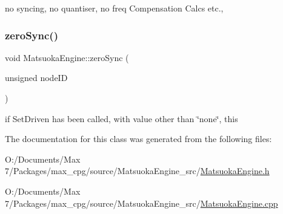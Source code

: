no syncing, no quantiser, no freq Compensation Calcs etc., 

\mbox{\label{classMatsuokaEngine_a9ecbc93a17a602d8358c189363397575}} 
\subsubsection{\texorpdfstring{zero\+Sync()}{zeroSync()}}
{\footnotesize\ttfamily void Matsuoka\+Engine\+::zero\+Sync (\begin{DoxyParamCaption}\item[{unsigned}]{node\+ID }\end{DoxyParamCaption})}



if Set\+Driven has been called, with value other than \char`\"{}none\char`\"{}, this 



The documentation for this class was generated from the following files\+:\begin{DoxyCompactItemize}
\item 
O\+:/\+Documents/\+Max 7/\+Packages/max\+\_\+cpg/source/\+Matsuoka\+Engine\+\_\+src/\mbox{\hyperlink{MatsuokaEngine_8h}{Matsuoka\+Engine.\+h}}\item 
O\+:/\+Documents/\+Max 7/\+Packages/max\+\_\+cpg/source/\+Matsuoka\+Engine\+\_\+src/\mbox{\hyperlink{MatsuokaEngine_8cpp}{Matsuoka\+Engine.\+cpp}}\end{DoxyCompactItemize}
